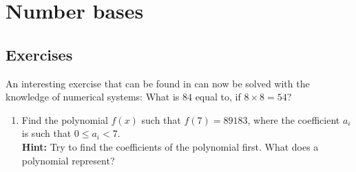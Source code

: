 \chapter{Number bases}

\section{Exercises}
An interesting exercise that can be found in \cite[p.49]{Pelerman1} can now be solved with the knowledge of numerical systems:
What is $84$ equal to, if $8\times 8 =54$?

\begin{enumerate}

\item Find the polynomial $f(x)$ such that $f(7)=89183$, where the coefficient $a_i$ is such that $0 \le a_i < 7$.\\
\textbf{Hint:} Try to find the coefficients of the polynomial first. What does a polynomial represent?
\end{enumerate}
